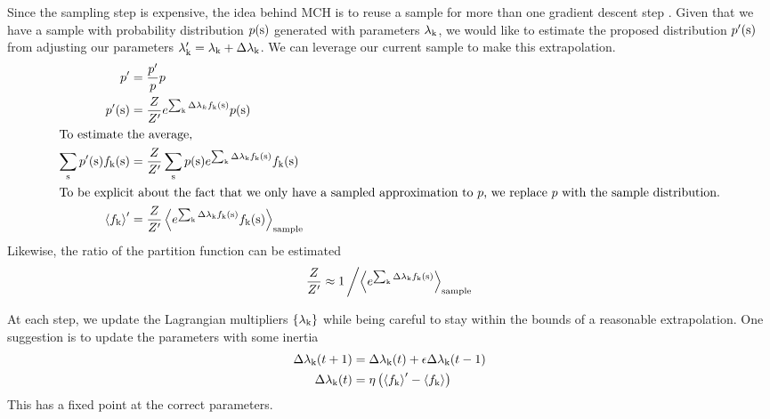 \documentclass{jors}
\begin{document}
Since the sampling step is expensive, the idea behind MCH is to reuse a sample for more than one gradient descent step \cite{Broderick:2007wq}. Given that we have a sample with probability distribution $p({\rm s})$ generated with parameters $\lambda_{\rm k}$, we would like to estimate the proposed distribution $p'({\rm s})$ from adjusting our parameters $\lambda_{\rm k}' = \lambda_{\rm k}+\Delta\lambda_{\rm k}$. We can leverage our current sample to make this extrapolation.
\begin{align}
	p' &= \frac{p'}{p}p\\
	p'({\rm s})	&= \frac{Z}{Z'}e^{\sum_{\rm k} \Delta\lambda_k f_{\rm k}({\rm s})} p({\rm s})\\
\intertext{To estimate the average,}
	\sum_{\rm s} p'({\rm s}) f_{\rm k}({\rm s}) &= \frac{Z}{Z'} \sum_{\rm s} p({\rm s}) e^{\sum_{\rm k} \Delta\lambda_{\rm k} f_{\rm k}({\rm s})} f_{\rm k}({\rm s})\\
\intertext{To be explicit about the fact that we only have a sampled approximation to $p$, we replace $p$ with the sample distribution.}
	\left<f_{\rm k}\right>' &= \frac{Z}{Z'} \left<e^{\sum_{\rm k} \Delta\lambda_{\rm k} f_{\rm k}({\rm s})} f_{\rm k}({\rm s})\right>_{\rm sample}
\end{align}
Likewise, the ratio of the partition function can be estimated
\begin{align}
	\frac{Z}{Z'} \approx 1\left/\left<e^{\sum_{\rm k} \Delta\lambda_{\rm k} f_{\rm k}({\rm s})}\right>_{\rm sample}\right.
\end{align}

At each step, we update the Lagrangian multipliers $\{\lambda_{\rm k}\}$ while being careful to stay within the bounds of a reasonable extrapolation. One suggestion is to update the parameters with some inertia \cite{Tkacik:2006vq}
\begin{align}
	\Delta\lambda_{\rm k}(t+1) &= \Delta \lambda_{\rm k}(t) + \epsilon \Delta\lambda_{\rm k}(t-1)\label{eq:mch learn1}\\
	\Delta \lambda_{\rm k}(t) &= \eta\left(\left<f_{\rm k}\right>'-\left<f_{\rm k}\right>\right)\label{eq:mch learn2}
\end{align}
This has a fixed point at the correct parameters.
\end{document}
